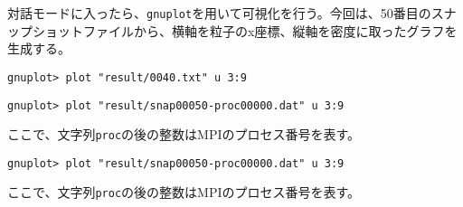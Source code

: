 対話モードに入ったら、\texttt{gnuplot}を用いて可視化を行う。今回は、50番目のスナップショットファイルから、横軸を粒子のx座標、縦軸を密度に取ったグラフを生成する。
\ifCpp %
\begin{screen}
\begin{verbatim}
gnuplot> plot "result/0040.txt" u 3:9
\end{verbatim}
\end{screen}
\endifCpp
\ifFtn %
\begin{screen}
\begin{verbatim}
gnuplot> plot "result/snap00050-proc00000.dat" u 3:9
\end{verbatim}
\end{screen}
ここで、文字列\texttt{proc}の後の整数はMPIのプロセス番号を表す。
\endifFtn
\ifC %
\begin{screen}
\begin{verbatim}
gnuplot> plot "result/snap00050-proc00000.dat" u 3:9
\end{verbatim}
\end{screen}
ここで、文字列\texttt{proc}の後の整数はMPIのプロセス番号を表す。
\endifC

